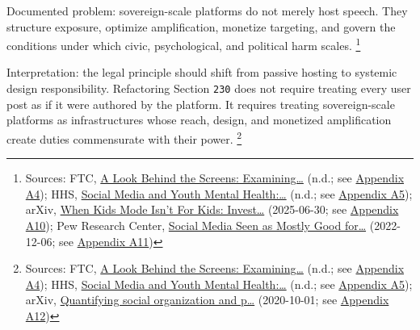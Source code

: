\documentclass[
  american,
  11pt,
  letterpaper,
]{article}
\begin{document}
Documented problem: sovereign-scale platforms do not merely host speech.
They structure exposure, optimize amplification, monetize targeting, and
govern the conditions under which civic, psychological, and political
harm scales. \footnote{Sources: FTC,
  \href{https://www.ftc.gov/reports/look-behind-screens-examining-data-practices-social-media-video-streaming-services}{A
  Look Behind the Screens: Examining\ldots{}} (n.d.; see
  \hyperref[ch-10-appendix-a4-a-look-behind-the-screens-examining-the-data-practices-of-social-media-and-video-streaming-services]{Appendix
  A4}); HHS,
  \href{https://www.hhs.gov/surgeongeneral/priorities/youth-mental-health/social-media/index.html}{Social
  Media and Youth Mental Health:\ldots{}} (n.d.; see
  \hyperref[ch-10-appendix-a5-social-media-and-youth-mental-health-the-u-s-surgeon-general-s-advisory]{Appendix
  A5}); arXiv, \href{https://arxiv.org/abs/2507.00299}{When Kids Mode
  Isn't For Kids: Invest\ldots{}} (2025-06-30; see
  \hyperref[ch-10-appendix-a10-when-kids-mode-isn-t-for-kids-investigating-tiktok-s-under-13-experience]{Appendix
  A10}); Pew Research Center,
  \href{https://www.pewresearch.org/global/2022/12/06/social-media-seen-as-mostly-good-for-democracy-across-many-nations-but-u-s-is-a-major-outlier/}{Social
  Media Seen as Mostly Good for\ldots{}} (2022-12-06; see
  \hyperref[ch-10-appendix-a11-social-media-seen-as-mostly-good-for-democracy-across-many-nations-but-u-s-is-a-major-outlier]{Appendix
  A11})}

Interpretation: the legal principle should shift from passive hosting to
systemic design responsibility. Refactoring Section \texttt{230} does
not require treating every user post as if it were authored by the
platform. It requires treating sovereign-scale platforms as
infrastructures whose reach, design, and monetized amplification create
duties commensurate with their power. \footnote{Sources: FTC,
  \href{https://www.ftc.gov/reports/look-behind-screens-examining-data-practices-social-media-video-streaming-services}{A
  Look Behind the Screens: Examining\ldots{}} (n.d.; see
  \hyperref[ch-10-appendix-a4-a-look-behind-the-screens-examining-the-data-practices-of-social-media-and-video-streaming-services]{Appendix
  A4}); HHS,
  \href{https://www.hhs.gov/surgeongeneral/priorities/youth-mental-health/social-media/index.html}{Social
  Media and Youth Mental Health:\ldots{}} (n.d.; see
  \hyperref[ch-10-appendix-a5-social-media-and-youth-mental-health-the-u-s-surgeon-general-s-advisory]{Appendix
  A5}); arXiv, \href{https://arxiv.org/abs/2010.00590}{Quantifying
  social organization and p\ldots{}} (2020-10-01; see
  \hyperref[ch-10-appendix-a12-quantifying-social-organization-and-political-polarization-in-online-platforms]{Appendix
  A12})}
\end{document}
